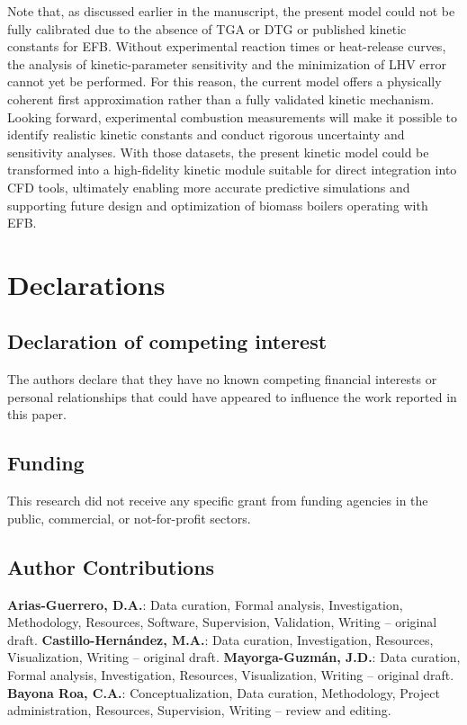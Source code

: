 \documentclass[preprint,12pt]{elsarticle}
\begin{document}
{Note that, as discussed earlier in the manuscript, the present model could not be fully calibrated due to the absence of TGA or DTG or published kinetic constants for EFB. Without experimental reaction times or heat-release curves, the analysis of kinetic-parameter sensitivity and the minimization of LHV error cannot yet be performed. For this reason, the current model offers a physically coherent first approximation rather than a fully validated kinetic mechanism.\\

Looking forward, experimental combustion measurements will make it possible to identify realistic kinetic constants and conduct rigorous uncertainty and sensitivity analyses. With those datasets, the present kinetic model could be transformed into a high-fidelity kinetic module suitable for direct integration into CFD tools, ultimately enabling more accurate predictive simulations and supporting future design and optimization of biomass boilers operating with EFB.\\
\section{Declarations}

\subsection{Declaration of competing interest}
The authors declare that they have no known competing financial interests or personal relationships that could have appeared to influence the work reported in this paper.

\subsection{Funding}
This research did not receive any specific grant from funding agencies in the public, commercial, or not-for-profit sectors.

\subsection{Author Contributions}

\textbf{Arias-Guerrero, D.A.}: Data curation, Formal analysis, Investigation, Methodology, Resources, Software, Supervision, Validation, Writing – original draft. \textbf{Castillo-Hernández, M.A.}: Data curation, Investigation, Resources, Visualization, Writing – original draft. \textbf{Mayorga-Guzmán, J.D.}: Data curation, Formal analysis, Investigation, Resources, Visualization, Writing – original draft. \textbf{Bayona Roa, C.A.}: Conceptualization, Data curation, Methodology, Project administration, Resources, Supervision, Writing – review and editing. 




}
\end{document}
